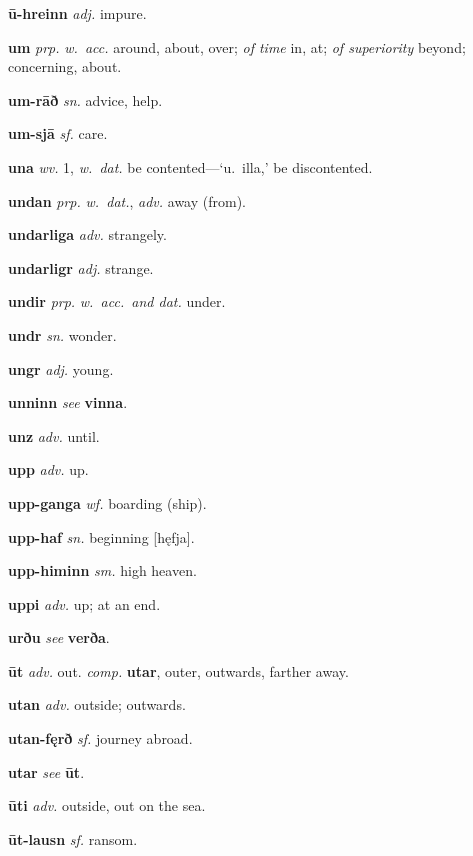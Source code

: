 \documentclass[12pt,letterpaper]{book}
\begin{document}
\noindent
\textbf{ū-hreinn} \textit{adj.} impure.

\noindent
\textbf{um} \textit{prp.} \textit{w.\ acc.} around, about, over; \textit{of
	time} in, at; \textit{of superiority} beyond; concerning, about.

\noindent
\textbf{um-rāð} \textit{sn.} advice, help.

\noindent
\textbf{um-sjā} \textit{sf.} care.

\noindent
\textbf{una} \textit{wv.} 1, \textit{w.\ dat.} be contented---`u.\ illa,' be
	discontented.

\noindent
\textbf{undan} \textit{prp.} \textit{w.\ dat.}, \textit{adv.} away (from).

\noindent
\textbf{undarliga} \textit{adv.} strangely.

\noindent
\textbf{undarligr} \textit{adj.} strange.

\noindent
\textbf{undir} \textit{prp.} \textit{w.\ acc.\ and dat.} under.

\noindent
\textbf{undr} \textit{sn.} wonder.

\noindent
\textbf{ungr} \textit{adj.} young.

\noindent
\textbf{unninn} \textit{} \textit{see} \textbf{vinna}.

\noindent
\textbf{unz} \textit{adv.} until.

\noindent
\textbf{upp} \textit{adv.} up.

\noindent
\textbf{upp-ganga} \textit{wf.} boarding (ship).

\noindent
\textbf{upp-haf} \textit{sn.} beginning [hęfja].

\noindent
\textbf{upp-himinn} \textit{sm.} high heaven.

\noindent
\textbf{uppi} \textit{adv.} up; at an end.

\noindent
\textbf{urðu} \textit{} \textit{see} \textbf{verða}.

\noindent
\textbf{ūt} \textit{adv.} out.  \textit{comp.} \textbf{utar}, outer, outwards,
	farther away.

\noindent
\textbf{utan} \textit{adv.} outside; outwards.

\noindent
\textbf{utan-fęrð} \textit{sf.} journey abroad.

\noindent
\textbf{utar} \textit{} \textit{see} \textbf{ūt}.

\noindent
\textbf{ūti} \textit{adv.} outside, out on the sea.

\noindent
\textbf{ūt-lausn} \textit{sf.} ransom.
\end{document}
